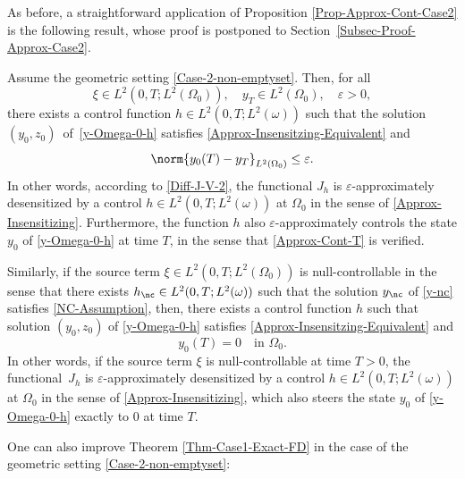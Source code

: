 As before, a straightforward application of Proposition \ref{Prop-Approx-Cont-Case2} is the following result, whose proof is postponed to Section~\ref{Subsec-Proof-Approx-Case2}.

\begin{theorem}
\label{Thm-Approx-Case2}
Assume the geometric setting \eqref{Case-2-non-emptyset}. Then, for all
\[
\xi \in L^2(0,T; L^2(\Omega_0)), \quad y_T \in L^2(\Omega_0),\quad\varepsilon >0,
\]
there exists a control function $h\!\!\in\!L^2(0,T; L^2(\omega))$ such that the solution $(y_0,z_0)$~of~\eqref{y-Omega-0-h} satisfies \eqref{Approx-Insensitzing-Equivalent} and
\begin{equation}
\label{Approx-Cont-T}
\norm{y_0(T) - y_T}_{L^2(\Omega_0)} \leq \varepsilon.
\end{equation}
In other words, according to \eqref{Diff-J-V-2}, the functional $J_h$ is $\varepsilon$-approximately desensitized by a control $h \in L^2(0,T; L^2(\omega))$ at $\Omega_0$ in the sense of \eqref{Approx-Insensitizing}. Furthermore, the function $h$ also $\varepsilon$-approximately controls the state $y_0$ of \eqref{y-Omega-0-h} at time $T$, in the sense that \eqref{Approx-Cont-T} is verified.

Similarly, if {the source term} $\xi \in L^2(0,T; L^2(\Omega_0))$ is null-controllable in the sense that there exists $h_{\nc} \in L^2(0,T; L^2(\omega))$ such that the solution $y_{\nc}$ of \eqref{y-nc} satisfies \eqref{NC-Assumption}, then, there exists a control function $h$ such that solution $(y_0,z_0)$ of \eqref{y-Omega-0-h} satisfies \eqref{Approx-Insensitzing-Equivalent} and
\begin{equation}
\label{NC-and-Approx-Insenstizing}
y_0(T) = 0 \quad\text{in } \Omega_0.
\end{equation}
In other words, if {the source term} $\xi$ is null-controllable at time $T>0$, the functional~$J_h$ is $\varepsilon$-approximately desensitized by a control $h \in L^2(0,T; L^2(\omega))$ at $\Omega_0$ in the sense of \eqref{Approx-Insensitizing}, which also steers the state $y_0$ of \eqref{y-Omega-0-h} exactly to $0$ at time $T$.
\end{theorem}

One can also improve Theorem \ref{Thm-Case1-Exact-FD} in the case of the geometric setting \eqref{Case-2-non-emptyset}:

